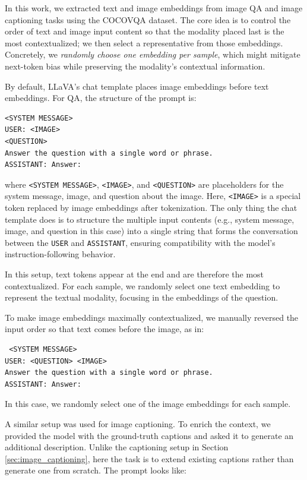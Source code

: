 In this work, we extracted text and image embeddings from image QA and image captioning tasks using the COCOVQA dataset. The core idea is to control the order of text and image input content so that the modality placed last is the most contextualized; we then select a representative from those embeddings. Concretely, we \emph{randomly choose one embedding per sample}, which might mitigate next-token bias while preserving the modality's contextual information.

By default, LLaVA's chat template places image embeddings before text embeddings. For QA, the structure of the prompt is:

\begin{verbatim}
<SYSTEM MESSAGE>
USER: <IMAGE> 
<QUESTION>
Answer the question with a single word or phrase.
ASSISTANT: Answer:
\end{verbatim}

where \texttt{<SYSTEM MESSAGE>}, \texttt{<IMAGE>}, and \texttt{<QUESTION>} are placeholders for the system message, image, and question about the image. Here, \texttt{<IMAGE>} is a special token replaced by image embeddings after tokenization. The only thing the chat template does is to structure the multiple input contents (e.g., system message, image, and question in this case) into a single string that forms the conversation between the \texttt{USER} and \texttt{ASSISTANT}, ensuring compatibility with the model's instruction-following behavior.

In this setup, text tokens appear at the end and are therefore the most contextualized. For each sample, we randomly select one text embedding to represent the textual modality, focusing in the embeddings of the question.

To make image embeddings maximally contextualized, we manually reversed the input order so that text comes before the image, as in:

\begin{verbatim} <SYSTEM MESSAGE>
USER: <QUESTION> <IMAGE>
Answer the question with a single word or phrase.
ASSISTANT: Answer:
\end{verbatim}

In this case, we randomly select one of the image embeddings for each sample.

A similar setup was used for image captioning. To enrich the context, we provided the model with the ground-truth captions and asked it to generate an additional description. Unlike the captioning setup in Section \ref{sec:image_captioning}, here the task is to extend existing captions rather than generate one from scratch. The prompt looks like:

